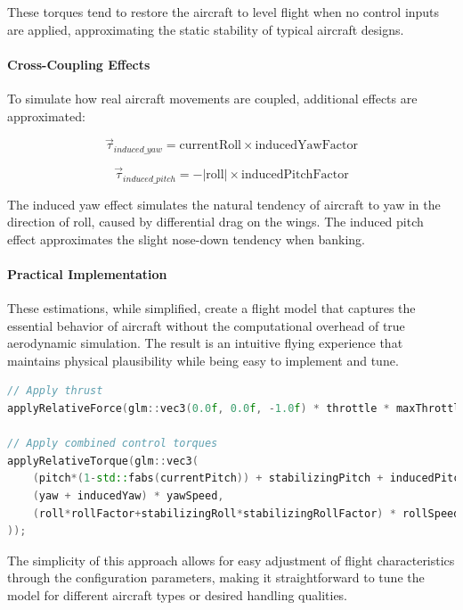 These torques tend to restore the aircraft to level flight when no control inputs are applied, approximating the static stability of typical aircraft designs.

\paragraph{Cross-Coupling Effects}
To simulate how real aircraft movements are coupled, additional effects are approximated:

\begin{equation}
\vec{\tau}_{induced\_yaw} = \text{currentRoll} \times \text{inducedYawFactor}
\end{equation}

\begin{equation}
\vec{\tau}_{induced\_pitch} = -|\text{roll}| \times \text{inducedPitchFactor}
\end{equation}

The induced yaw effect simulates the natural tendency of aircraft to yaw in the direction of roll, caused by differential drag on the wings. The induced pitch effect approximates the slight nose-down tendency when banking.

\paragraph{Practical Implementation}
These estimations, while simplified, create a flight model that captures the essential behavior of aircraft without the computational overhead of true aerodynamic simulation. The result is an intuitive flying experience that maintains physical plausibility while being easy to implement and tune.

\begin{lstlisting}[language=C++, caption={Force application in update method}, label=src:force_application]
// Apply thrust
applyRelativeForce(glm::vec3(0.0f, 0.0f, -1.0f) * throttle * maxThrottle);

// Apply combined control torques
applyRelativeTorque(glm::vec3(
    (pitch*(1-std::fabs(currentPitch)) + stabilizingPitch + inducedPitch) * pitchSpeed,
    (yaw + inducedYaw) * yawSpeed,
    (roll*rollFactor+stabilizingRoll*stabilizingRollFactor) * rollSpeed
));
\end{lstlisting}

The simplicity of this approach allows for easy adjustment of flight characteristics through the configuration parameters, making it straightforward to tune the model for different aircraft types or desired handling qualities.


